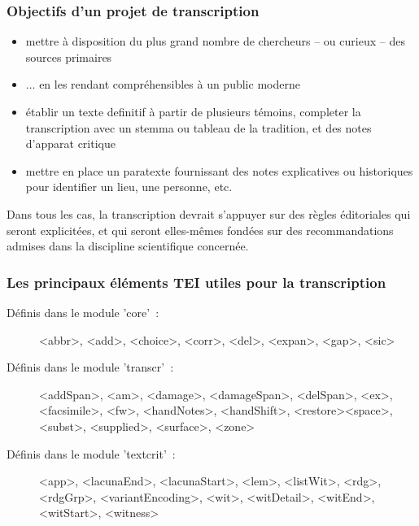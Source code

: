 \documentclass[]{beamer}\makeatletter
\begin{document}
\begin{frame}
\frametitle{Objectifs d'un projet de transcription}\begin{itemize}

\item mettre à disposition du plus grand nombre de chercheurs -- ou       curieux -- des sources primaires
\item ... en les rendant compréhensibles à un public moderne
\item établir un texte definitif à partir de plusieurs témoins,       completer la transcription avec un stemma ou tableau de la       tradition, et des notes d’apparat critique
\item mettre en place un paratexte fournissant des notes explicatives       ou historiques pour identifier un lieu, une personne, etc.
\end{itemize} \par\begin{exampleblock}{}
Dans tous les cas, la transcription devrait s'appuyer sur      des règles éditoriales qui seront explicitées, et qui seront      elles-mêmes fondées sur des recommandations admises dans la discipline      scientifique concernée.\end{exampleblock}\par

\end{frame}

\begin{frame}
\frametitle{Les principaux éléments TEI utiles pour la transcription}\begin{description}

\item[Définis dans le module 'core' :]{\color{blue2}<abbr>}, {\color{blue2}<add>}, {\color{blue2}<choice>}, {\color{blue2}<corr>},        {\color{blue2}<del>}, {\color{blue2}<expan>}, {\color{blue2}<gap>}, {\color{blue2}<sic>}
\item[Définis dans le module 'transcr' :]{\color{blue2}<addSpan>}, {\color{blue2}<am>}, {\color{blue2}<damage>}, {\color{blue2}<damageSpan>},        {\color{blue2}<delSpan>}, {\color{blue2}<ex>}, {\color{blue2}<facsimile>}, {\color{blue2}<fw>},        {\color{blue2}<handNotes>}, {\color{blue2}<handShift>}, {\color{blue2}<restore>}{\color{blue2}<space>}, {\color{blue2}<subst>}, {\color{blue2}<supplied>}, {\color{blue2}<surface>},        {\color{blue2}<zone>}
\item[Définis dans le module 'textcrit' :]{\color{blue2}<app>}, {\color{blue2}<lacunaEnd>}, {\color{blue2}<lacunaStart>},       {\color{blue2}<lem>}, {\color{blue2}<listWit>}, {\color{blue2}<rdg>}, {\color{blue2}<rdgGrp>},        {\color{blue2}<variantEncoding>}, {\color{blue2}<wit>}, {\color{blue2}<witDetail>},        {\color{blue2}<witEnd>}, {\color{blue2}<witStart>}, {\color{blue2}<witness>}
\end{description} 
\end{frame}
\end{document}
